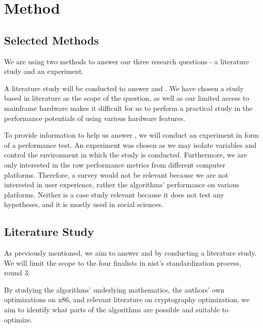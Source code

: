 \chapter{Method}
\label{chapter:method}

\section{Selected Methods}
\label{section:method:selected-method}

We are using two methods to answer our three research questions - a literature study and an experiment.

A literature study will be conducted to answer  and . We have chosen a study based in literature as the scope of the question, as well as our limited access to mainframe hardware makes it difficult for us to perform a practical study in the performance potentials of using various hardware features.

To provide information to help us answer , we will conduct an experiment in form of a performance test. An experiment was chosen as we may isolate variables and control the environment in which the study is conducted. Furthermore, we are only interested in the raw performance metrics from different computer platforms. Therefore, a survey would not be relevant because we are not interested in user experience, rather the algorithms' performance on various platforms. Neither is a case study relevant because it does not test any hypotheses, and it is mostly used in social sciences\cite{wohlin2012}.

\section{Literature Study}
\label{section:method:literature-study}

As previously mentioned, we aim to answer  and  by conducting a literature study. We will limit the scope to the four finalists in \gls{nist}'s standardization process, round 3.

By studying the algorithms' underlying mathematics, the authors' own optimizations on \gls{x86}, and relevant literature on cryptography optimization, we aim to identify what parts of the algorithms are possible and suitable to optimize.

